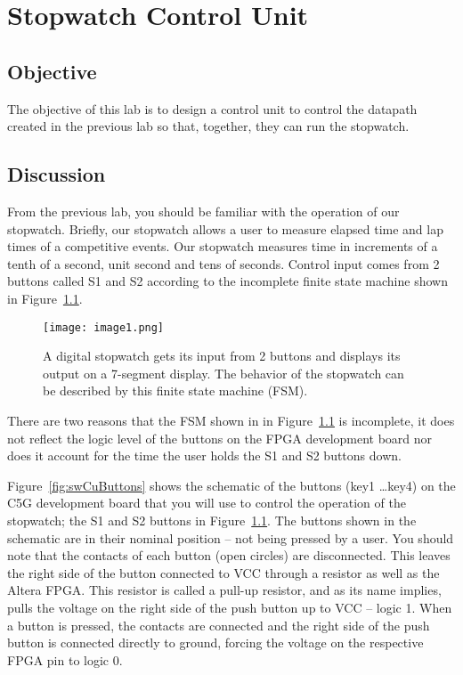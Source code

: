 \chapter{Stopwatch Control Unit}
\label{chapter:stopControl}
\graphicspath{ {./Lab10ControlUnit/Fig} }

\hypertarget{objective}{%
\section{Objective }\label{section:swControlObjective}}

The objective of this lab is to design a control unit to control the
datapath created in the previous lab so that, together, they can run the
stopwatch.

\section{Discussion}

From the previous lab, you should be familiar with the operation of our
stopwatch. Briefly, our stopwatch allows a user to measure elapsed time
and lap times of a competitive events. Our stopwatch measures time in
increments of a tenth of a second, unit second and tens of seconds.
Control input comes from 2 buttons called S1 and S2 according to the
incomplete finite state machine shown in Figure~\ref{fig:swCuHighLevel}.

\begin{figure}[ht]
\texttt{[image: image1.png]}
\caption{ A digital stopwatch gets its input from 2 buttons and displays
its output on a 7-segment display. The behavior of the stopwatch can be
described by this finite state machine (FSM).}
\label{fig:swCuHighLevel}
\end{figure}

There are two reasons that the FSM shown in in Figure~\ref{fig:swCuHighLevel} is incomplete,
it does not reflect the logic level of the buttons on the FPGA development board nor
does it account for the time the user holds the S1 and S2 buttons down.

Figure~\ref{fig:swCuButtons} shows the schematic of the buttons (key1 \ldots key4) on the
C5G development board that you will use to control the operation of the
stopwatch; the S1 and S2 buttons in Figure~\ref{fig:swCuHighLevel}. The buttons shown in the
schematic are in their nominal position -- not being pressed by a user.
You should note that the contacts of each button (open circles) are
disconnected. This leaves the right side of the button connected to VCC
through a resistor as well as the Altera FPGA. This resistor is called a
pull-up resistor, and as its name implies, pulls the voltage on the
right side of the push button up to VCC -- logic 1. When a button is
pressed, the contacts are connected and the right side of the push
button is connected directly to ground, forcing the voltage on the
respective FPGA pin to logic 0.

